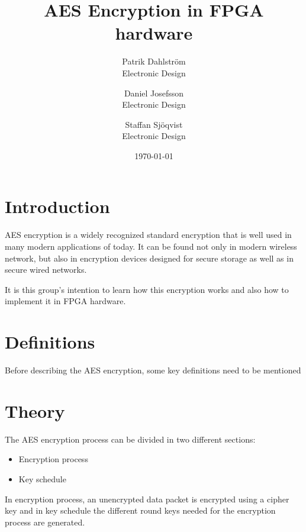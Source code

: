 \documentclass{report}
\title{AES Encryption in FPGA hardware}
\author{
        Patrik Dahlström \\
        Electronic Design\\
            \and
        Daniel Josefsson\\
        Electronic Design\\
            \and
        Staffan Sjöqvist\\
        Electronic Design
}}
\date{\today}
\begin{document}
\maketitle



\chapter{Introduction}
AES encryption is a widely recognized standard encryption that is well used in many modern applications of today. It can be found not only in modern wireless network, but also in encryption devices designed for secure storage as well as in secure wired networks.

It is this group's intention to learn how this encryption works and also how to implement it in FPGA hardware.

\chapter{Definitions}
Before describing the AES encryption, some key definitions need to be mentioned



\chapter{Theory}
\label{sec:theory}
The AES encryption process can be divided in two different sections:
\begin{itemize}
\item Encryption process
\item Key schedule
\end{itemize}
In encryption process, an unencrypted data packet is encrypted using a cipher key and in key schedule the different round keys needed for the encryption process are generated.






\end{document}
